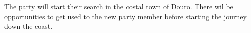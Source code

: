 The party will start their search in the costal town of Douro.
There wil be opportunities to get used to the new party member before starting the journey down the coast.
